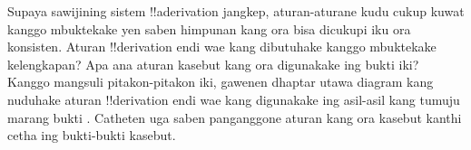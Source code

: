 \documentclass[../../../include/open-logic-section]{subfiles}
\begin{document}
\begin{prob}
Supaya sawijining sistem !!a{derivation} jangkep, aturan-aturane kudu cukup kuwat
kanggo mbuktekake yen saben himpunan kang ora bisa dicukupi iku ora
konsisten. Aturan !!{derivation} endi wae kang dibutuhake kanggo
mbuktekake kelengkapan? Apa ana aturan kasebut kang ora digunakake ing
bukti iki? Kanggo mangsuli pitakon-pitakon iki, gawenen dhaptar utawa
diagram kang nuduhake aturan !!{derivation} endi wae kang digunakake ing
asil-asil kang tumuju marang bukti
. Catheten uga saben panganggone
aturan kang ora kasebut kanthi cetha ing bukti-bukti kasebut.
\end{prob}
\tagendprob
\end{document}
